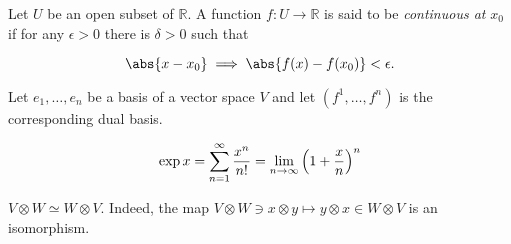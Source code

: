 \documentclass{article}
\begin{document}
Let \( U \) be an open subset of \( \mathbb{R} \).
A function \( f:U \to \mathbb{R} \) is said to be \textit{continuous at } \( x_0 \) if for any \( \epsilon > 0 \) there is \( \delta > 0 \) such that

\begin{equation*}
	\abs{x - x_0} \implies \abs{f(x) - f(x_0)} < \epsilon.
\end{equation*}

Let \( e_1, \ldots, e_n \) be a basis of a vector space \( V \) and let \( \left( f^1, \ldots, f^n \right) \) is the corresponding dual basis.

\begin{equation*}
	\exp x = \sum_{n=1}^{\infty} \frac{x^n}{n!} \\
	= \lim_{n \to \infty} \left( 1 + \frac{x}{n}  \right)^{n}
\end{equation*}

\( V \otimes W \simeq W \otimes V \).
Indeed, the map \( V \otimes W \ni x \otimes y \mapsto y \otimes x \in W \otimes V \) is an isomorphism.
\end{document}
